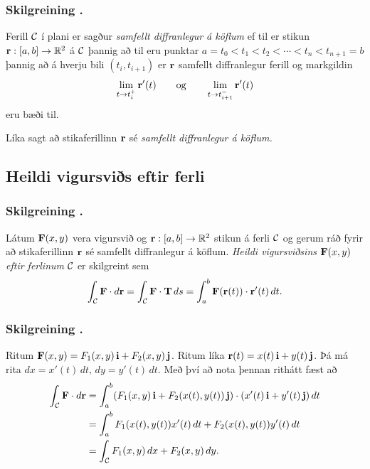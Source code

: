 \subsubsection{Skilgreining \kaflanr.}
Ferill $\cal C$ í plani er sagður {\em samfellt diffranlegur á köflum} ef til er stikun $\mbox{${\bf r}$}:[a,b]\rightarrow {\mathbb R}^2$ á $\cal C$ þannig að  til eru punktar $a=t_0<t_1<t_2<\cdots<t_n<t_{n+1}=b$ þannig að á hverju bili $(t_i,t_{i+1})$ er $\mbox{${\bf r}$}$ samfellt diffranlegur ferill og markgildin
$$\lim_{t\rightarrow t_i^+}\mbox{${\bf r}$}'(t)\qquad\mbox{og}\qquad 
\lim_{t\rightarrow t_{i+1}^-}\mbox{${\bf r}$}'(t)$$
eru bæði til.  

Líka sagt að stikaferillinn $\mbox{${\bf r}$}$ sé {\em samfellt diffranlegur á köflum.}



\subsection{Heildi vigursviðs eftir ferli} 

\subsubsection{Skilgreining \kaflanr.}
Látum $\mbox{${\bf F}$}(x,y)$ vera vigursvið og $\mbox{${\bf r}$}:[a,b]\rightarrow {\mathbb R}^2$ stikun á ferli $\cal C$ og gerum ráð fyrir að stikaferillinn $\mbox{${\bf r}$}$ sé samfellt diffranlegur á köflum.  {\em Heildi vigursviðsins $\mbox{${\bf F}$}(x,y)$ eftir ferlinum} $\cal C$ er skilgreint sem 
$$\int_{\cal C} \mbox{${\bf F}$}\cdot d\mbox{${\bf r}$}= \int_{\cal C} \mbox{${\bf F}$}\cdot \mbox{${\bf T}$}\,ds
=\int_a^b \mbox{${\bf F}$}(\mbox{${\bf r}$}(t))\cdot \mbox{${\bf r}$}'(t)\,dt.$$



\subsubsection{Skilgreining \kaflanr.}
Ritum $\mbox{${\bf F}$}(x,y)=F_1(x,y)\,\mbox{${\bf i}$}+F_2(x,y)\,\mbox{${\bf j}$}$.  Ritum líka $\mbox{${\bf r}$}(t)=x(t)\,\mbox{${\bf i}$}+y(t)\,\mbox{${\bf j}$}$.  Þá má rita
$dx=x'(t)\,dt,\, dy=y'(t)\,dt$.  Með því að nota þennan rithátt fæst að 
\begin{align*}
\int_{\cal C}\mbox{${\bf F}$}\cdot d\mbox{${\bf r}$}&=\int_a^b
(F_1(x,y)\,\mbox{${\bf i}$}+F_2(x(t),y(t))\,\mbox{${\bf j}$})\cdot(x'(t)\,\mbox{${\bf i}$}+y'(t)\,\mbox{${\bf j}$})\,dt\\
&=\int_a^b F_1(x(t),y(t))x'(t)\,dt+F_2(x(t),y(t))y'(t)\,dt\\
&=\int_{\cal C} F_1(x,y)\,dx+F_2(x,y)\,dy.
\end{align*}




